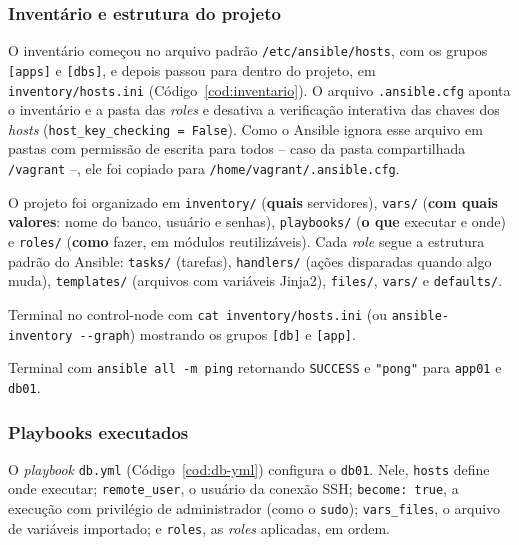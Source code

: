 \subsubsection{Inventário e estrutura do projeto}

O inventário começou no arquivo padrão \texttt{/etc/ansible/hosts}, com os grupos \texttt{[apps]} e
\texttt{[dbs]}, e depois passou para dentro do projeto, em \texttt{inventory/hosts.ini}
(Código~\ref{cod:inventario}). O arquivo \texttt{.ansible.cfg} aponta o inventário e a pasta das
\textit{roles} e desativa a verificação interativa das chaves dos \textit{hosts}
(\texttt{host\_key\_checking = False}). Como o Ansible ignora esse arquivo em pastas com permissão de
escrita para todos -- caso da pasta compartilhada \texttt{/vagrant} --, ele foi copiado para
\texttt{/home/vagrant/.ansible.cfg}.


O projeto foi organizado em \texttt{inventory/} (\textbf{quais} servidores), \texttt{vars/}
(\textbf{com quais valores}: nome do banco, usuário e senhas), \texttt{playbooks/} (\textbf{o que}
executar e onde) e \texttt{roles/} (\textbf{como} fazer, em módulos reutilizáveis). Cada \textit{role}
segue a estrutura padrão do Ansible: \texttt{tasks/} (tarefas), \texttt{handlers/} (ações disparadas
quando algo muda), \texttt{templates/} (arquivos com variáveis Jinja2), \texttt{files/}, \texttt{vars/}
e \texttt{defaults/}.

%
  {Terminal no control-node com \texttt{cat inventory/hosts.ini} (ou
   \texttt{ansible-inventory -{}-graph}) mostrando os grupos \texttt{[db]} e \texttt{[app]}.}

%
  {Terminal com \texttt{ansible all -m ping} retornando \texttt{SUCCESS} e \texttt{"pong"} para
   \texttt{app01} e \texttt{db01}.}

\subsubsection{Playbooks executados}

O \textit{playbook} \texttt{db.yml} (Código~\ref{cod:db-yml}) configura o \texttt{db01}. Nele,
\texttt{hosts} define onde executar; \texttt{remote\_user}, o usuário da conexão SSH;
\texttt{become: true}, a execução com privilégio de administrador (como o \texttt{sudo});
\texttt{vars\_files}, o arquivo de variáveis importado; e \texttt{roles}, as \textit{roles}
aplicadas, em ordem.

